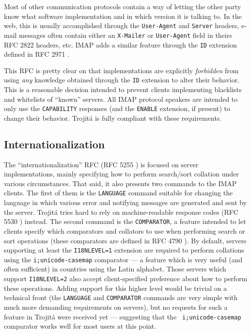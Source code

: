 \documentclass[trojita]{subfiles}
\begin{document}
Most of other communication protocols contain a way of letting the other party know what software implementation and in
which version it is talking to.  In the web, this is usually accomplished through the {\tt User-Agent} and {\tt Server}
headers, e-mail messages often contain either an {\tt X-Mailer} or {\tt User-Agent} field in theirs RFC 2822 headers,
etc.  IMAP adds a similar feature through the {\tt ID} extension defined in RFC 2971 \cite{rfc2971}.

This RFC is pretty clear on that implementations are explicitly {\em forbidden} from using {\em any} knowledge obtained
through the {\tt ID} extension to alter their behavior.  This is a reasonable decision intended to prevent clients
implementing blacklists and whitelists of ``known'' servers.  All IMAP protocol speakers are intended to only use the
{\tt CAPABILITY} responses (and the {\tt ENABLE} extension, if present) to change their behavior.  Trojitá is fully
compliant with these requirements.

\subsection{Internationalization}

The ``internationalization'' RFC (RFC 5255 \cite{rfc5255}) is focused on server implementations, mainly specifying how
to perform search/sort collation under various circumstances.  That said, it also presents two commands to the IMAP
clients.  The first of them is the {\tt LANGUAGE} command suitable for changing the language in which various error and
notifying messages are generated and sent by the server.  Trojitá tries hard to rely on machine-readable response codes
(RFC 5530 \cite{rfc5530}) instead.  The second command is the {\tt COMPARATOR}, a feature intended to let clients
specify which comparators and collators to use when performing search or sort operations (these comparators are defined
in RFC 4790 \cite{rfc4790}).  By default, servers supporting at least the {\tt I18NLEVEL=1} extension are required to
perform collations using the {\tt i;unicode-casemap} comparator \cite{rfc5051} --- a feature which is very useful (and
often sufficient) in countries using the Latin alphabet.  Those servers which support {\tt I18NLEVEL=2} also accept
client-specified preference about how to perform these operations.  Adding support for this higher level would be
trivial on a technical front (the {\tt LANGUAGE} and {\tt COMPARATOR} commands are very simple with much more demanding
requirements on servers), but no requests for such a feature in Trojitá were received yet --- suggesting that the {\tt
i;unicode-casemap} comparator works well for most users at this point.
\end{document}
